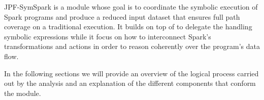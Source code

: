 \label{ch:jpf-symspark}

JPF-SymSpark is a \jpf module whose goal is to coordinate the symbolic execution of Spark programs and produce a reduced input dataset that ensures full path coverage on a traditional execution. It builds on top of \spf to delegate the handling symbolic expressions while it focus on how to interconnect Spark's transformations and actions in order to reason coherently over the program's data flow.

In the following sections we will provide an overview of the logical process carried out by the analysis and an explanation of the different components that conform the module.




